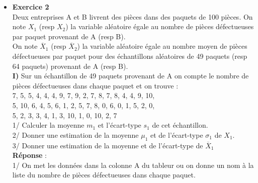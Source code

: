 \documentclass[a4paper,11pt]{book}
\begin{document}
\begin{itemize}
\item {\bf Exercice 2}\\
Deux entreprises A et B livrent des pi\`eces dans des paquets de 100 pi\`eces.
On note $X_1$ (resp $X_2$) la variable al\'eatoire \'egale au nombre de 
pi\`eces d\'efectueuses par paquet provenant de A (resp B).\\
On note $\overline X_1$ (resp $\overline X_2$) la variable al\'eatoire \'egale 
au nombre moyen de pi\`eces d\'efectueuses par paquet pour des \'echantillons 
al\'eatoires de 49 paquets (resp 64 paquets) provenant de A (resp B).\\
 {\bf I)} Sur un \'echantillon de 49 paquets provenant de A on compte le
 nombre de pi\`eces d\'efectueuses dans chaque paquet et on trouve : \\
7, 5, 5, 4, 4, 4, 9, 7, 9, 2, 7, 8, 7, 8, 4, 4, 9, 10,\\
5, 10, 6, 4, 5, 6, 1, 2, 5, 7, 8, 0, 6, 0, 1, 5, 2, 0,\\
5, 2, 3, 3, 4, 1, 3, 10, 1, 0, 10, 2, 7\\
1/ Calculer la moyenne $m_1$ et l'\'ecart-type $s_1$ de cet \'echantillon.\\
2/ Donner une estimation de la moyenne $\mu_1$ et de l'\'ecart-type $\sigma_1$
de $X_1$.\\
3/ Donner une estimation de la moyenne et de l'\'ecart-type de $\overline X_1$\\
{\bf R\'eponse} :\\
1/ On met les donn\'ees dans la colonne A du tableur ou on donne un nom \`a la 
liste du nombre de pi\`eces d\'efectueuses dans chaque paquet.\\


\end{itemize}
\end{document}
